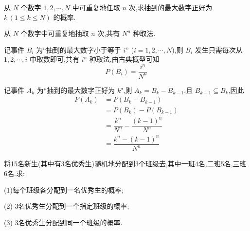 \question 从 $N$ 个数字 $1,2,\cdots,N$ 中可重复地任取 $n$ 次,求抽到的最大数字正好为 $k \, (1 \leqslant k \leqslant N)$ 的概率.

\begin{solution}
    从 $N$ 个数字中可重复地抽取 $n$ 次,共有 $N^n$ 种取法.

    记事件 $B_i$ 为``抽到的最大数字小于等于 $i$'' ($i=1,2,\cdots,N$),则 $B_i$ 发生只需每次从 $1,2,\cdots,i$ 中取数即可,共有 $i^n$ 种取法,由古典概型可知
    $$
    P(B_i) = \dfrac{i^n}{N^n}
    $$

    记事件 $A_k$ 为``抽到的最大数字正好为 $k$",则 $A_k = B_k - B_{k-1}$,且 $B_{k-1} \subseteq B_k$,因此
    $$
    \begin{aligned}
        P(A_k) &= P(B_k - B_{k-1}) \\
        &= P(B_k) - P(B_{k-1}) \\
        &= \dfrac{k^n}{N^n} - \dfrac{(k-1)^n}{N^n} \\
        &= \dfrac{k^n - (k-1)^n}{N^n}
    \end{aligned}
    $$
\end{solution}

\question 将15名新生(其中有3名优秀生)随机地分配到3个班级去,其中一班4名,二班5名,三班6名.求:

(1)每个班级各分配到一名优秀生的概率;

(2) 3名优秀生分配到一个指定班级的概率;

(3) 3名优秀生分配到同一个班级的概率.

